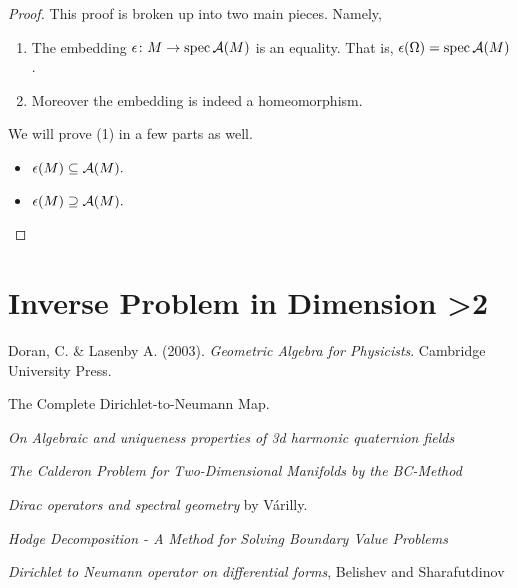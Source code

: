 \documentclass[12pt]{article}
\begin{document}
\begin{proof}
This proof is broken up into two main pieces. Namely,
\begin{enumerate}[(1)]
    \item The embedding $\epsilon \colon M \to \operatorname{spec} \mathcal{A}(M)$ is an equality. That is, $\epsilon(\Omega)= \operatorname{spec} \mathcal{A}(M)$.
    \item Moreover the embedding is indeed a homeomorphism.
\end{enumerate}
We will prove (1) in a few parts as well.
\begin{itemize}
    \item $\epsilon(M) \subseteq \mathcal{A}(M).$ 
    \item $\epsilon(M) \supseteq \mathcal{A}(M).$
\end{itemize}
\end{proof}


\section{Inverse Problem in Dimension >2}

\newpage
\begin{thebibliography}{1}
	
	 Doran, C. \& Lasenby A. (2003). \emph{Geometric Algebra for Physicists}. Cambridge University Press.
	
	 The Complete Dirichlet-to-Neumann Map.
	
	 \emph{On Algebraic and uniqueness properties of 3d harmonic quaternion fields}
	
	 \emph{The Calderon Problem for Two-Dimensional Manifolds by the BC-Method}
	
	 \emph{Dirac operators and spectral geometry} by V\'arilly.
	
	 \emph{Hodge Decomposition - A Method for Solving Boundary Value Problems}
	
	 \emph{Dirichlet to Neumann operator on differential forms}, Belishev and Sharafutdinov
	
\end{thebibliography}
\end{document}
